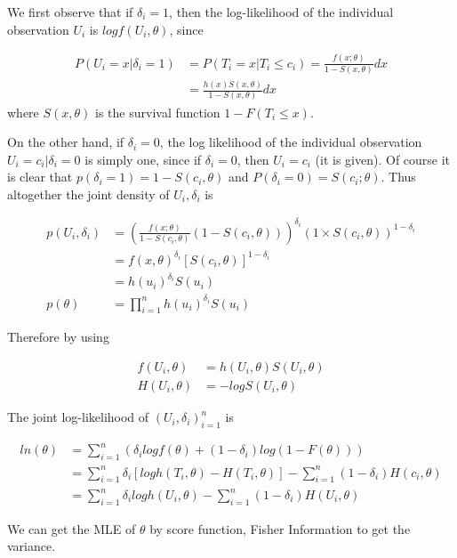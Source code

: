 \documentclass[11pt]{article} %
\begin{document}
We first observe that if $\delta_i = 1$, then the log-likelihood of the individual observation $U_i$ is $log f(U_i, \theta)$, since

\begin{align*}
	P(U_i= x| \delta_i=1) & = P(T_i= x| T_i \leq c_i) = \frac{f(x; \theta)}{ 1- S(x, \theta)} dx\\
	& = \frac{h(x) S(x,\theta)}{1- S(x, \theta)} dx
\end{align*}
where $S(x, \theta)$ is the survival function $1- F(T_i \leq x)$.

On the other hand, if $\delta_i = 0$, the log likelihood of the individual observation $U_i = c_i|\delta_i = 0$ is simply one, since if $\delta_i = 0$, then $U_i = c_i$ (it is given). Of course it is clear that $p(\delta_i= 1) = 1 - S(c_i, \theta)$ and $P(\delta_i = 0) = S(c_i; \theta)$. Thus altogether the joint density of ${U_i, \delta_i}$ is

\begin{align*}
	p(U_i, \delta_i) & = \left(\frac{f(x; \theta)}{1- S(c_i, \theta)} (1- S(c_i, \theta)) \right)^{\delta_i} \left(1 \times S(c_i, \theta) \right)^{1-\delta_i} \\
		&=f(x, \theta)^{\delta_i} [S(c_i, \theta)]^{1-\delta_i}\\
		&= h(u_i)^{\delta_i} S(u_i)\\
	p(\theta) &= \prod_{i=1}^n h(u_i)^{\delta_i} S(u_i)
\end{align*}

	
Therefore by using

\begin{align*}
	f(U_i, \theta) & = h(U_i, \theta) S(U_i, \theta) \\
	H(U_i, \theta) &= -log S(U_i, \theta)
\end{align*}

The joint log-likelihood of ${(U_i, \delta_i)}_{i=1}^n$ is

\begin{align*}
	ln(\theta) & = \sum_{i=1}^n \left(\delta_i log f(\theta) + (1-\delta_i) log (1- F(\theta)) \right) \\
	&= \sum_{i=1}^n \delta_i \left[log h(T_i, \theta) - H(T_i, \theta) \right] - \sum_{i=1}^n  (1-\delta_i) H(c_i, \theta)  \\
	&= \sum_{i=1}^n \delta_i log h(U_i, \theta) - \sum_{i=1}^n  (1-\delta_i) H(U_i,  \theta)
\end{align*}

We can get the MLE of $\theta$ by score function, Fisher Information to get the variance. 
\end{document}
